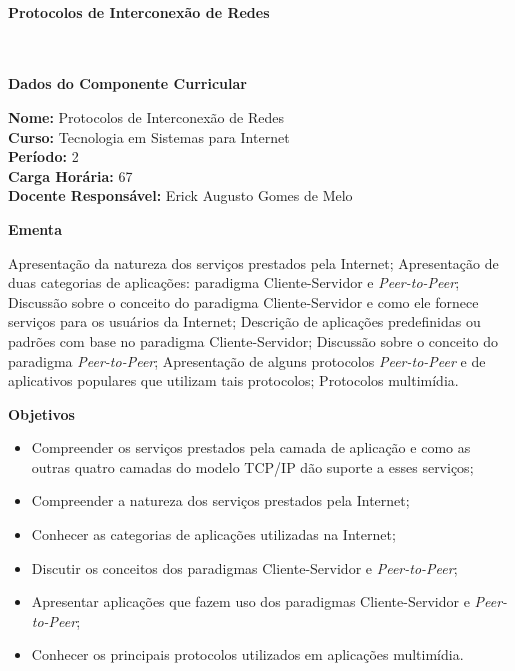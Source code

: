 \paragraph{Protocolos de Interconexão de Redes} \


\begin{snugshade}\begin{center}\textbf{
	Dados do Componente Curricular
}\end{center}\end{snugshade}

\noindent 	\textbf{Nome:} Protocolos de Interconexão de Redes
\\ 			\textbf{Curso:} Tecnologia em Sistemas para Internet
\\ 			\textbf{Período:} \unit{2}{\degree}
\\ 			\textbf{Carga Horária:} \unit{67}{\hour}
\\ 			\textbf{Docente Responsável:} Erick Augusto Gomes de Melo


\begin{snugshade}\begin{center}\textbf{
    Ementa
\vphantom{q}}\end{center}\end{snugshade}

\noindent
Apresentação da natureza dos serviços prestados pela Internet; Apresentação de duas categorias de aplicações: paradigma Cliente-Servidor e \textit{Peer-to-Peer}; Discussão sobre o conceito do paradigma Cliente-Servidor e como ele fornece serviços para os usuários da Internet; Descrição de aplicações predefinidas ou padrões com base no paradigma Cliente-Servidor; Discussão sobre o conceito do paradigma \textit{Peer-to-Peer}; Apresentação de alguns protocolos \textit{Peer-to-Peer} e de aplicativos populares que utilizam tais protocolos; Protocolos multimídia.

\begin{snugshade}\begin{center}\textbf{
    Objetivos
}\end{center}\end{snugshade}


\begin{itemize}

\item Compreender os serviços prestados pela camada de aplicação e como as outras quatro camadas do modelo TCP/IP dão suporte a esses serviços;
\item Compreender a natureza dos serviços prestados pela Internet;
\item Conhecer as categorias de aplicações utilizadas na Internet;
\item Discutir os conceitos dos paradigmas Cliente-Servidor e \textit{Peer-to-Peer};
\item Apresentar aplicações que fazem uso dos paradigmas Cliente-Servidor e \textit{Peer-to-Peer};
\item Conhecer os principais protocolos utilizados em aplicações multimídia.

\end{itemize} 

